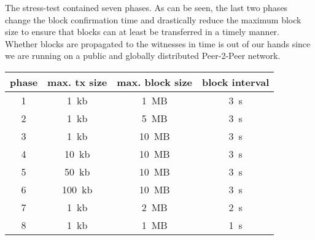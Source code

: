 The stress-test contained seven phases. As can be seen, the last two phases
change the block confirmation time and drastically reduce the maximum block
size to ensure that blocks can at least be transferred in a timely manner.
Whether blocks are propagated to the witnesses in time is out of our hands
since we are running on a public and globally distributed Peer-2-Peer network.

\begin{tabular}{c|c|c|c}
 \textbf{phase} & \textbf{max. tx size} & \textbf{max. block size} & \textbf{block interval} \\\hline
 1 & \SI{1}{kb}   & \SI{1}{MB}  & \SI{3}{s} \\
 2 & \SI{1}{kb}   & \SI{5}{MB}  & \SI{3}{s} \\
 3 & \SI{1}{kb}   & \SI{10}{MB} & \SI{3}{s} \\
 4 & \SI{10}{kb}  & \SI{10}{MB} & \SI{3}{s} \\
 5 & \SI{50}{kb}  & \SI{10}{MB} & \SI{3}{s} \\
 6 & \SI{100}{kb} & \SI{10}{MB} & \SI{3}{s} \\
 7 & \SI{1}{kb}   & \SI{2}{MB}  & \SI{2}{s} \\
 8 & \SI{1}{kb}   & \SI{1}{MB}  & \SI{1}{s} \\\hline
\end{tabular}
